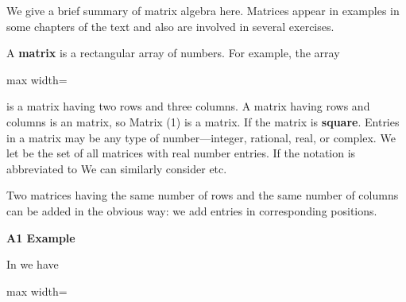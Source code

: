 \documentclass[11pt,oneside]{article}
\begin{document}
\fi
\renewcommand{\BookFooter}{Appendix: Matrix Algebra}
\ifdefined\BookMaster\else\setcounter{page}{391}\fi
\BookNarrativetrue

\begin{BookBody}


\noindent We give a brief summary of matrix algebra here. Matrices appear in examples in some chapters of the text and also are involved in several exercises.

A\textbf{ matrix} is a rectangular array of numbers. For example, the array

\begin{center}\begin{adjustbox}{max width=\linewidth}\end{adjustbox}\end{center}

\noindent is a matrix having two rows and three columns. A matrix having  rows and  columns is an  matrix, so Matrix (1) is a  matrix. If  the matrix is\textbf{ square}. Entries in a matrix may be any type of number—integer, rational, real, or complex. We let  be the set of all  matrices with real number entries. If  the notation is abbreviated to  We can similarly consider  etc.

Two matrices having the same number  of rows and the same number  of columns can be added in the obvious way: we add entries in corresponding positions.

\textbf{A1 Example}

\noindent In  we have

\begin{center}\begin{adjustbox}{max width=\linewidth}\end{adjustbox}\end{center}


\end{BookBody}
\end{document}
